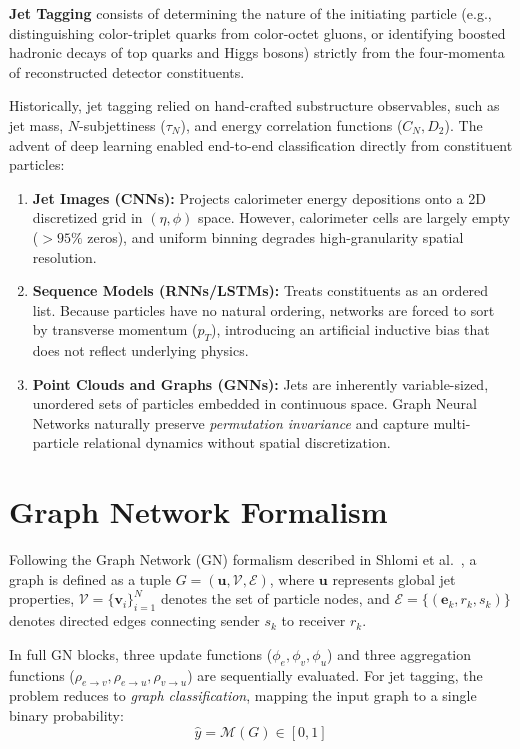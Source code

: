 \documentclass[10pt,twocolumn,letterpaper]{article}
\begin{document}
\textbf{Jet Tagging} consists of determining the nature of the initiating particle (e.g., distinguishing color-triplet quarks from color-octet gluons, or identifying boosted hadronic decays of top quarks and Higgs bosons) strictly from the four-momenta of reconstructed detector constituents.

Historically, jet tagging relied on hand-crafted substructure observables, such as jet mass, $N$-subjettiness ($\tau_N$), and energy correlation functions ($C_N, D_2$). The advent of deep learning enabled end-to-end classification directly from constituent particles:
\begin{enumerate}
    \item \textbf{Jet Images (CNNs):} Projects calorimeter energy depositions onto a 2D discretized grid in $(\eta, \phi)$ space. However, calorimeter cells are largely empty ($>95\%$ zeros), and uniform binning degrades high-granularity spatial resolution.
    \item \textbf{Sequence Models (RNNs/LSTMs):} Treats constituents as an ordered list. Because particles have no natural ordering, networks are forced to sort by transverse momentum ($p_T$), introducing an artificial inductive bias that does not reflect underlying physics.
    \item \textbf{Point Clouds and Graphs (GNNs):} Jets are inherently variable-sized, unordered sets of particles embedded in continuous space. Graph Neural Networks naturally preserve \emph{permutation invariance} and capture multi-particle relational dynamics without spatial discretization.
\end{enumerate}

\section{Graph Network Formalism}
Following the Graph Network (GN) formalism described in Shlomi et al.~\cite{shlomi2020gnn}, a graph is defined as a tuple $G = (\mathbf{u}, \mathcal{V}, \mathcal{E})$, where $\mathbf{u}$ represents global jet properties, $\mathcal{V} = \{\mathbf{v}_i\}_{i=1}^{N}$ denotes the set of particle nodes, and $\mathcal{E} = \{(\mathbf{e}_k, r_k, s_k)\}$ denotes directed edges connecting sender $s_k$ to receiver $r_k$.

In full GN blocks, three update functions ($\phi_e, \phi_v, \phi_u$) and three aggregation functions ($\rho_{e \to v}, \rho_{e \to u}, \rho_{v \to u}$) are sequentially evaluated. For jet tagging, the problem reduces to \emph{graph classification}, mapping the input graph to a single binary probability:
\begin{equation}
    \hat{y} = \mathcal{M}(G) \in [0, 1]
\end{equation}
\end{document}
